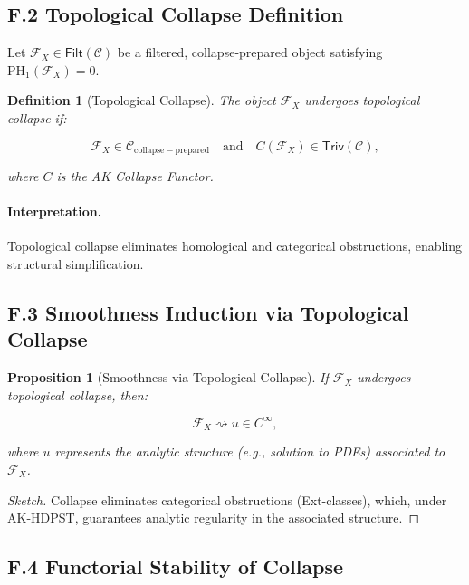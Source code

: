 \documentclass[11pt]{article}
\newtheorem{definition}[theorem]{Definition}
\newtheorem{proposition}[theorem]{Proposition}
\begin{document}
\subsection*{F.2 Topological Collapse Definition}

Let \( \mathcal{F}_X \in \mathsf{Filt}(\mathcal{C}) \) be a filtered, collapse-prepared object satisfying \( \mathrm{PH}_1(\mathcal{F}_X) = 0 \).

\begin{definition}[Topological Collapse]
The object \( \mathcal{F}_X \) undergoes \emph{topological collapse} if:

\[
\mathcal{F}_X \in \mathcal{C}_{\mathrm{collapse-prepared}} \quad \text{and} \quad C(\mathcal{F}_X) \in \mathsf{Triv}(\mathcal{C}),
\]

where \( C \) is the AK Collapse Functor.
\end{definition}

\paragraph{Interpretation.}
Topological collapse eliminates homological and categorical obstructions, enabling structural simplification.

\subsection*{F.3 Smoothness Induction via Topological Collapse}

\begin{proposition}[Smoothness via Topological Collapse]
If \( \mathcal{F}_X \) undergoes topological collapse, then:

\[
\mathcal{F}_X \rightsquigarrow u \in C^\infty,
\]

where \( u \) represents the analytic structure (e.g., solution to PDEs) associated to \( \mathcal{F}_X \).
\end{proposition}

\begin{proof}[Sketch]
Collapse eliminates categorical obstructions (Ext-classes), which, under AK-HDPST, guarantees analytic regularity in the associated structure.
\end{proof}

\subsection*{F.4 Functorial Stability of Collapse}
\end{document}
